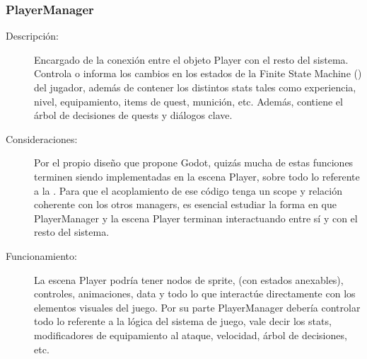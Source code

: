 \subsubsection{PlayerManager}\label{modelado:playermanager}
\begin{description}
	\item[Descripción:] Encargado de la conexión entre el objeto Player con el resto del sistema. Controla o informa los cambios en los estados de la Finite State Machine () del jugador, además de contener los distintos stats tales como experiencia, nivel, equipamiento, items de quest, munición, etc. Además, contiene el árbol de decisiones de quests y diálogos clave.
	
	\item[Consideraciones:] Por el propio diseño que propone Godot, quizás mucha de estas funciones terminen siendo implementadas en la escena Player, sobre todo lo referente a la . Para que el acoplamiento de ese código tenga un scope y relación coherente con los otros managers, es esencial estudiar la forma en que PlayerManager y la escena Player terminan interactuando entre sí y con el resto del sistema.
	
	\item[Funcionamiento:] La escena Player podría tener nodos de sprite,  (con estados anexables), controles, animaciones, data y todo lo que interactúe directamente con los elementos visuales del juego. Por su parte PlayerManager debería controlar todo lo referente a la lógica del sistema de juego, vale decir los stats, modificadores de equipamiento al ataque, velocidad, árbol de decisiones, etc.
\end{description}
	
